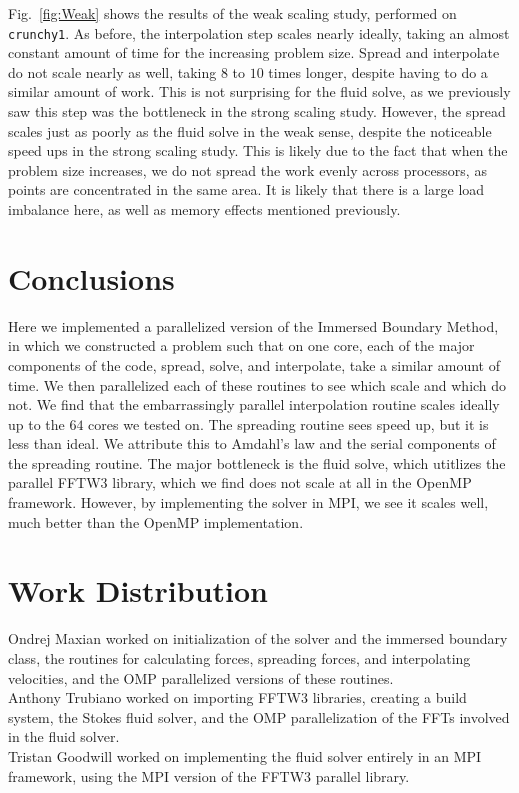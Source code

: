 \documentclass[]{article}
\begin{document}
Fig.\ \ref{fig:Weak} shows the results of the weak scaling study, performed on \texttt{crunchy1}. As before, the interpolation step scales nearly ideally, taking an almost constant amount of time for the increasing problem size. Spread and interpolate do not scale nearly as well, taking $8$ to $10$ times longer, despite having to do a similar amount of work. This is not surprising for the fluid solve, as we previously saw this step was the bottleneck in the strong scaling study. However, the spread scales just as poorly as the fluid solve in the weak sense, despite the noticeable speed ups in the strong scaling study. This is likely due to the fact that when the problem size increases, we do not spread the work evenly across processors, as points are concentrated in the same area. It is likely that there is a large load imbalance here, as well as memory effects mentioned previously. 


\section{Conclusions}
Here we implemented a parallelized version of the Immersed Boundary Method, in which we constructed a problem such that on one core, each of the major components of the code, spread, solve, and interpolate, take a similar amount of time. We then parallelized each of these routines to see which scale and which do not. We find that the embarrassingly parallel interpolation routine scales ideally up to the $64$ cores we tested on. The spreading routine sees speed up, but it is less than ideal. We attribute this to Amdahl's law and the serial components of the spreading routine. The major bottleneck is the fluid solve, which utitlizes the parallel FFTW3 library, which we find does not scale at all in the OpenMP framework. However, by implementing the solver in MPI, we see it scales well, much better than the OpenMP implementation.  


\section{Work Distribution}
Ondrej Maxian worked on initialization of the solver and the immersed boundary class, the routines for calculating forces, spreading forces, and interpolating velocities, and the OMP parallelized versions of these routines. \\

Anthony Trubiano worked on importing FFTW3 libraries, creating a build system, the Stokes fluid solver, and the OMP parallelization of the FFTs involved in the fluid solver.\\

Tristan Goodwill worked on implementing the fluid solver entirely in an MPI framework, using the MPI version of the FFTW3 parallel library. \\






\newpage



\end{document}
